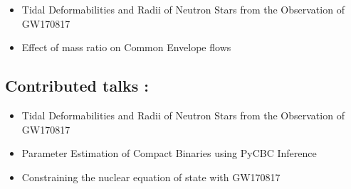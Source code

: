 \begin{addmargin}[1em]{0em}
{
  {\begin{itemize}
    \renewcommand{\labelitemi}{~}
    \item Tidal Deformabilities and Radii of Neutron Stars from the Observation of GW170817
  \end{itemize}
  }
}

{
  {\begin{itemize}
    \renewcommand{\labelitemi}{~}
    \item Effect of mass ratio on Common Envelope flows
  \end{itemize}
  }
}
\end{addmargin}

\vspace{2mm}
\subsection{\textbf{Contributed talks :}}
\begin{addmargin}[1em]{0em}
{
  {\begin{itemize}
    \renewcommand{\labelitemi}{~}
    \item Tidal Deformabilities and Radii of Neutron Stars from the Observation of GW170817
  \end{itemize}
  }
}

{
  {\begin{itemize}
    \renewcommand{\labelitemi}{~}
    \item Parameter Estimation of Compact Binaries using PyCBC Inference
  \end{itemize}
  }
}

{
  {\begin{itemize}
    \renewcommand{\labelitemi}{~}
    \item Constraining the nuclear equation of state with GW170817
  \end{itemize}
  }
}
\end{addmargin}

